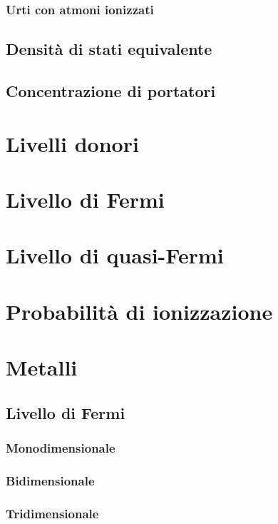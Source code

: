 \documentclass[10pt,a4paper]{report}
\begin{document}
		\subsection{Urti con atmoni ionizzati}

	\section{Densità di stati equivalente}

	\section{Concentrazione di portatori}

\chapter{Livelli donori}

\chapter{Livello di Fermi}

\chapter{Livello di quasi-Fermi}

\chapter{Probabilità di ionizzazione}

\chapter{Metalli}

	\section{Livello di Fermi}

		\subsection{Monodimensionale}

		\subsection{Bidimensionale}

		\subsection{Tridimensionale}
\end{document}
